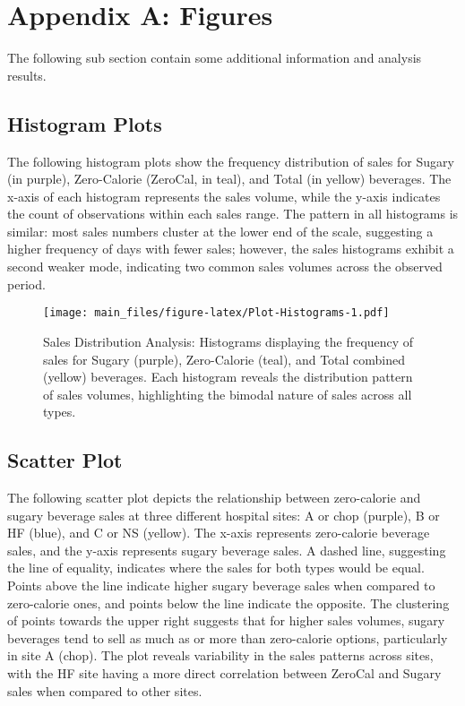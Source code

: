 \documentclass[
]{article}
\begin{document}
\pagebreak

\hypertarget{appendix-a-figures}{%
\section{Appendix A: Figures}\label{appendix-a-figures}}

The following sub section contain some additional information and analysis results.

\hypertarget{histogram-plots}{%
\subsection{Histogram Plots}\label{histogram-plots}}

The following histogram plots show the frequency distribution of sales for Sugary (in purple), Zero-Calorie (ZeroCal, in teal), and Total (in yellow) beverages. The x-axis of each histogram represents the sales volume, while the y-axis indicates the count of observations within each sales range. The pattern in all histograms is similar: most sales numbers cluster at the lower end of the scale, suggesting a higher frequency of days with fewer sales; however, the sales histograms exhibit a second weaker mode, indicating two common sales volumes across the observed period.

\begin{figure}
\centering
\texttt{[image: main\_files/figure-latex/Plot-Histograms-1.pdf]}
\caption{\label{fig:Plot-Histograms}Sales Distribution Analysis: Histograms displaying the frequency of sales for Sugary (purple), Zero-Calorie (teal), and Total combined (yellow) beverages. Each histogram reveals the distribution pattern of sales volumes, highlighting the bimodal nature of sales across all types.}
\end{figure}

\hypertarget{scatter-plot}{%
\subsection{Scatter Plot}\label{scatter-plot}}

The following scatter plot depicts the relationship between zero-calorie and sugary beverage sales at three different hospital sites: A or chop (purple), B or HF (blue), and C or NS (yellow). The x-axis represents zero-calorie beverage sales, and the y-axis represents sugary beverage sales. A dashed line, suggesting the line of equality, indicates where the sales for both types would be equal. Points above the line indicate higher sugary beverage sales when compared to zero-calorie ones, and points below the line indicate the opposite. The clustering of points towards the upper right suggests that for higher sales volumes, sugary beverages tend to sell as much as or more than zero-calorie options, particularly in site A (chop). The plot reveals variability in the sales patterns across sites, with the HF site having a more direct correlation between ZeroCal and Sugary sales when compared to other sites.
\end{document}
